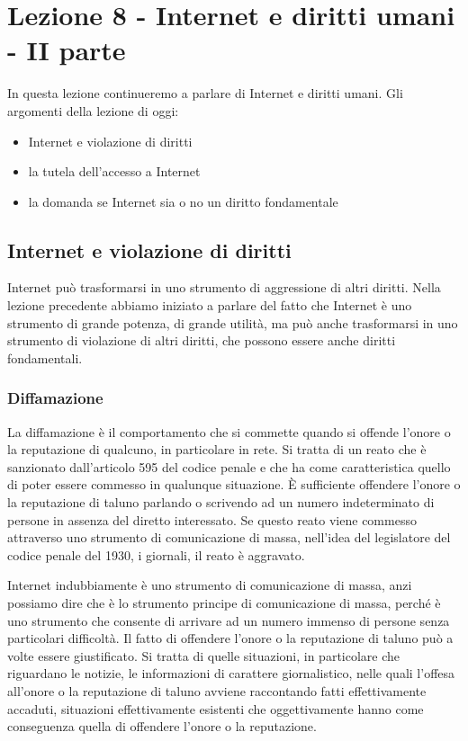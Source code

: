 \chapter{Lezione 8 -  Internet e diritti umani - II parte}

In questa lezione continueremo a parlare di Internet e diritti umani. Gli argomenti della lezione di oggi:
\begin{itemize}
    \item Internet e violazione di diritti
    \item la tutela dell'accesso a Internet
    \item la domanda se Internet sia o no un diritto fondamentale
\end{itemize}

\section{Internet e violazione di diritti}

Internet può trasformarsi in uno strumento di aggressione di altri diritti. Nella lezione precedente abbiamo iniziato a parlare del fatto che Internet è uno strumento di grande potenza, di grande utilità, ma può anche trasformarsi in uno strumento di violazione di altri diritti, che possono essere anche diritti fondamentali.\par

\subsection{Diffamazione}
La diffamazione è il comportamento che si commette quando si offende l'onore o la reputazione di qualcuno, in particolare in rete. Si tratta di un reato che è sanzionato dall'articolo 595 del codice penale e che ha come caratteristica quello di poter essere commesso in qualunque situazione. È sufficiente offendere l'onore o la reputazione di taluno parlando o scrivendo ad un numero indeterminato di persone in assenza del diretto interessato. Se questo reato viene commesso attraverso uno strumento di comunicazione di massa, nell'idea del legislatore del codice penale del 1930, i giornali, il reato è aggravato.\par
Internet indubbiamente è uno strumento di comunicazione di massa, anzi possiamo dire che è lo strumento principe di comunicazione di massa, perché è uno strumento che consente di arrivare ad un numero immenso di persone senza particolari difficoltà. Il fatto di offendere l'onore o la reputazione di taluno può a volte essere giustificato. Si tratta di quelle situazioni, in particolare che riguardano le notizie, le informazioni di carattere giornalistico, nelle quali l'offesa all'onore o la reputazione di taluno avviene raccontando fatti effettivamente accaduti, situazioni effettivamente esistenti che oggettivamente hanno come conseguenza quella di offendere l'onore o la reputazione.
